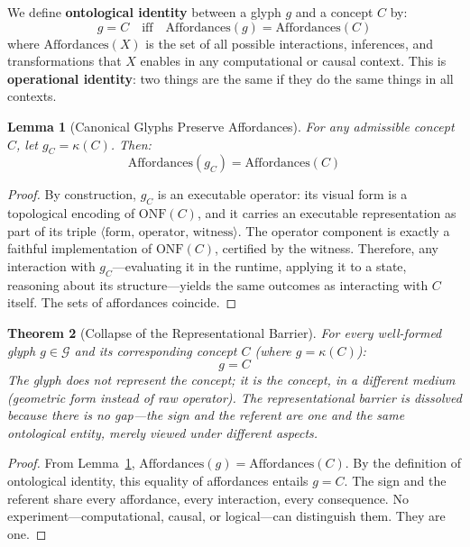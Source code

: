 \documentclass[12pt, letterpaper]{book}
\def\equiv{=}%
\def\mathfrak#1{#1}%
\newtheorem{theorem}{Theorem}[chapter]
\newtheorem{lemma}[theorem]{Lemma}
\begin{document}
We define \textbf{ontological identity} between a glyph $\mathfrak{g}$ and a concept $C$ by:
\[
\mathfrak{g} \equiv C \quad\text{iff}\quad \mathrm{Affordances}(\mathfrak{g}) = \mathrm{Affordances}(C)
\]
where $\mathrm{Affordances}(X)$ is the set of all possible interactions, inferences, and transformations that $X$ enables in any computational or causal context. This is \textbf{operational identity}: two things are the same if they do the same things in all contexts.

\begin{lemma}[Canonical Glyphs Preserve Affordances]\label{lem:afford}
For any admissible concept $C$, let $\mathfrak{g}_C = \kappa(C)$. Then:
\[
\mathrm{Affordances}(\mathfrak{g}_C) = \mathrm{Affordances}(C)
\]
\end{lemma}

\begin{proof}
By construction, $\mathfrak{g}_C$ is an executable operator: its visual form is a topological encoding of $\mathrm{ONF}(C)$, and it carries an executable representation as part of its triple $\langle\mathrm{form},\, \mathrm{operator},\, \mathrm{witness}\rangle$. The operator component is exactly a faithful implementation of $\mathrm{ONF}(C)$, certified by the witness. Therefore, any interaction with $\mathfrak{g}_C$---evaluating it in the runtime, applying it to a state, reasoning about its structure---yields the same outcomes as interacting with $C$ itself. The sets of affordances coincide.
\end{proof}

\begin{theorem}[Collapse of the Representational Barrier]\label{thm:repr-collapse}
For every well-formed glyph $\mathfrak{g} \in \mathcal{G}$ and its corresponding concept $C$ (where $\mathfrak{g} = \kappa(C)$):
\[
\boxed{\mathfrak{g} \equiv C}
\]
The glyph does not \textit{represent} the concept; it \textit{is} the concept, in a different medium (geometric form instead of raw operator). The representational barrier is dissolved because there is no gap---the sign and the referent are one and the same ontological entity, merely viewed under different aspects.
\end{theorem}

\begin{proof}
From Lemma~\ref{lem:afford}, $\mathrm{Affordances}(\mathfrak{g}) = \mathrm{Affordances}(C)$. By the definition of ontological identity, this equality of affordances entails $\mathfrak{g} \equiv C$. The sign and the referent share every affordance, every interaction, every consequence. No experiment---computational, causal, or logical---can distinguish them. They are one.
\end{proof}
\end{document}
